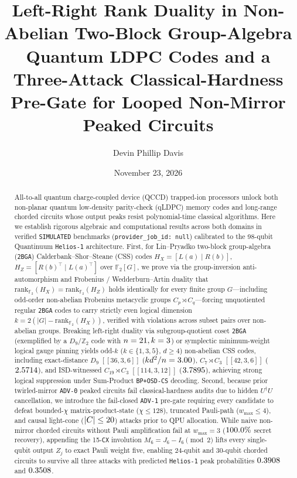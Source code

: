 \documentclass[aps,prapplied,reprint,longbibliography]{revtex4-2}
\begin{document}
\title{Left-Right Rank Duality in Non-Abelian Two-Block Group-Algebra Quantum LDPC Codes and a Three-Attack Classical-Hardness Pre-Gate for Looped Non-Mirror Peaked Circuits}

\author{Devin Phillip Davis}

\date{November 23, 2026}

\begin{abstract}
All-to-all quantum charge-coupled device (QCCD) trapped-ion processors unlock both non-planar quantum low-density parity-check (qLDPC) memory codes and long-range chorded circuits whose output peaks resist polynomial-time classical algorithms. Here we establish rigorous algebraic and computational results across both domains in verified \texttt{SIMULATED} benchmarks (\texttt{provider\_job\_id: null}) calibrated to the 98-qubit Quantinuum \texttt{Helios-1} architecture. First, for Lin--Pryadko two-block group-algebra (\texttt{2BGA}) Calderbank--Shor--Steane (CSS) codes $H_X = [L(a)\mid R(b)]$, $H_Z = [R(b)^\top \mid L(a)^\top]$ over $\mathbb{F}_2[G]$, we prove via the group-inversion anti-automorphism and Frobenius / Wedderburn--Artin duality that $\mathrm{rank}_{\mathbb{F}_2}(H_X) = \mathrm{rank}_{\mathbb{F}_2}(H_Z)$ holds identically for every finite group $G$---including odd-order non-abelian Frobenius metacyclic groups $C_p \rtimes C_q$---forcing unquotiented regular \texttt{2BGA} codes to carry strictly even logical dimension $k = 2(|G| - \mathrm{rank}_{\mathbb{F}_2}(H_X))$, verified with \TwoBgaRankViolations{} violations across \TwoBgaPairsChecked{} subset pairs over \TwoBgaGroupsCount{} non-abelian groups. Breaking left-right duality via subgroup-quotient coset \texttt{2BGA} (exemplified by a $D_9/\mathbb{Z}_2$ code with $n=21{}, k=3{}$) or symplectic minimum-weight logical gauge pinning yields \TwoBgaOddKCount{} odd-$k$ ($k \in \{1, 3, 5\}$, $d \ge 4$) non-abelian CSS codes, including exact-distance $D_9$ $[[36,3,6]]$ ($kd^2/n = 3.00{}$), $C_7 \rtimes C_3$ $[[42,3,6]]$ ($2.5714{}$), and ISD-witnessed $C_{19} \rtimes C_3$ $[[114,3,12]]$ ($3.7895{}$), achieving strong logical suppression under Sum-Product \texttt{BP+OSD-CS} decoding. Second, because prior twirled-mirror \texttt{ADV-0} peaked circuits fail classical-hardness audits due to hidden $U^\dagger U$ cancellation, we introduce the fail-closed \texttt{ADV-1} pre-gate requiring every candidate to defeat bounded-$\chi$ matrix-product-state ($\chi \le 128$), truncated Pauli-path ($w_{\max} \le 4$), and causal light-cone ($|C| \le 20{}$) attacks prior to QPU allocation. While naive non-mirror chorded circuits without Pauli amplification fail at $w_{\max}=3$ ($100.0{}\%$ secret recovery), appending the 15-\texttt{CX} involution $M_6 = J_6 - I_6 \pmod 2$ lifts every single-qubit output $Z_j$ to exact Pauli weight five, enabling 24-qubit and 30-qubit chorded circuits to survive all three attacks with predicted \texttt{Helios-1} peak probabilities $0.3908{}$ and $0.3508{}$.
\end{abstract}
\end{document}
